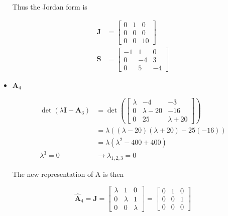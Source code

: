 \begin{itemize}
 Thus the Jordan form is

 \begin{align*}
 \mathbf{J} &= \begin{bmatrix}
                       0 & 1 & 0\\ 0&0&0\\0&0&10
                      \end{bmatrix}\\
  \mathbf{S} &= \begin{bmatrix}
   -1 & 1 & 0\\
   0 & -4 & 3\\
   0 & 5 & -4
  \end{bmatrix}
 \end{align*}




 \item $\mathbf{A}_4$


 \begin{align*}
\det(\lambda \mathbf{I} - \mathbf{A}_3) &= \det \left( \begin{bmatrix}
                                   \lambda & -4 & -3\\
                                   0 & \lambda -20 & -16\\
                                   0 & 25 & \lambda +20
                                  \end{bmatrix}
 \right)\\
 &= \lambda((\lambda -20)(\lambda +20)-25(-16))\\
 &= \lambda (\lambda^2 -400+400)\\
 \lambda^3 = 0 &\rightarrow \lambda_{1,2,3} =0
 \end{align*}

 The new representation of A is then

  \begin{equation*}
  \hat{\mathbf{A}}_4 = \mathbf{J}  =  \begin{bmatrix}
                                       \lambda & 1 & 0\\
                                       0 & \lambda & 1\\
                                       0 & 0 & \lambda
                                      \end{bmatrix}
 = \begin{bmatrix}
                       0 & 1 & 0\\ 0&0&1\\0&0&0
                      \end{bmatrix}
 \end{equation*}


\end{itemize}
